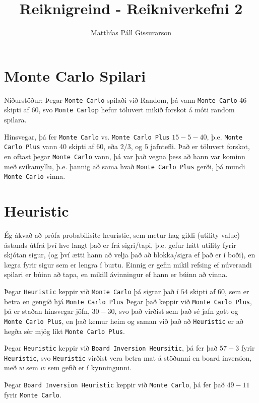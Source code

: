 \documentclass[12pt]{article}
\title{Reiknigreind - Reikniverkefni 2}
\author{Matthías Páll Gissurarson}
\begin{document}
\maketitle

\section{Monte Carlo Spilari}

Niðurstöður:
Þegar \verb|Monte Carlo| spilaði við Random, þá vann \verb|Monte Carlo|  46 skipti af 60,
svo \verb|Monte Carlo|p hefur töluvert mikið forskot á móti random spilara.

Hinsvegar, þá fer \verb|Monte Carlo| vs. \verb|Monte Carlo Plus| $15-5-40$,
þ.e. \verb|Monte Carlo Plus| vann 40 skipti af 60, eða $2/3$, og $5$ jafntefli. Það er töluvert forskot,
en oftast þegar \verb|Monte Carlo| vann, þá var það vegna þess að hann var kominn með svikamyllu,
þ.e. þannig að sama hvað \verb|Monte Carlo Plus| gerði, þá mundi \verb|Monte Carlo| vinna.


\section{Heuristic}

Ég ákvað að prófa probabilisitc heuristic, sem metur hag gildi (utility value) ástands
útfrá því hve langt það er frá sigri/tapi, þ.e. gefur hátt utility fyrir skjótan sigur,
(og því ætti hann að velja það að blokka/sigra ef það er í boði),
en lægra fyrir sigur sem er lengra í burtu.
Einnig er gefin mikil refsing ef núverandi spilari er búinn að tapa,
en mikill ávinningur ef hann er búinn að vinna.

Þegar \verb|Heuristic| keppir við \verb|Monte Carlo|
þá sigrar það í $54$ skipti af $60$, sem er betra en gengið hjá \verb|Monte Carlo Plus|
Þegar það keppir við \verb|Monte Carlo Plus|, þá er staðan hinsvegar jöfn,
$30-30$, svo það virðist sem það sé jafn gott og \verb|Monte Carlo Plus|,
en það kemur heim og saman við það að \verb|Heuristic| er að hegða sér mjög líkt
\verb|Monte Carlo Plus|.

Þegar \verb|Heuristic| keppir við \verb|Board Inversion Heursitic|, þá fer það $57-3$ fyrir
\verb|Heuristic|, svo \verb|Heuristic| virðist vera betra mat á stöðunni en board inversion,
með $w$ sem $w$ sem gefið er í kynningunni.

Þegar \verb|Board Inversion Heuristic| keppir við \verb|Monte Carlo|, þá fer það $49-11$ fyrir
\verb|Monte Carlo|.
\end{document}
